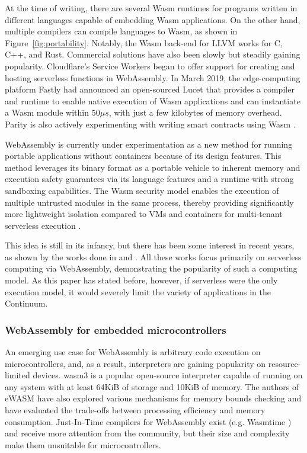 At the time of writing, there are several Wasm runtimes for programs written in different languages capable of embedding Wasm applications. On the other hand, multiple compilers can compile languages to Wasm, as shown in Figure~\ref{fig:portability}. Notably, the Wasm back-end for LLVM \cite{llvm} works for C, C++, and Rust. Commercial solutions have also been slowly but steadily gaining popularity. Cloudflare's Service Workers \cite{cloudflare-workers} began to offer support for creating and hosting serverless functions in WebAssembly. In March 2019, the edge-computing platform Fastly had announced an open-sourced Lucet \cite{fastly-lucet} that provides a compiler and runtime to enable native execution of Wasm applications and can instantiate a Wasm module within $50\mu s$, with just a few kilobytes of memory overhead. Parity is also actively experimenting with writing smart contracts using Wasm \cite{parity-wasm}.

WebAssembly is currently under experimentation as a new method for running portable applications without containers because of its design features. This method leverages its binary format as a portable vehicle to inherent memory and execution safety guarantees via its language features and a runtime with strong sandboxing capabilities. The Wasm security model enables the execution of multiple untrusted modules in the same process, thereby providing significantly more lightweight isolation compared to VMs and containers for multi-tenant serverless execution \cite{gadepalli2020sledge}.

This idea is still in its infancy, but there has been some interest in recent years, as shown by the works done in \cite{hall2019execution} and \cite{shillaker2020faasm}. All these works focus primarily on serverless computing via WebAssembly, demonstrating the popularity of such a computing model. As this paper has stated before, however, if serverless were the only execution model, it would severely limit the variety of applications in the Continuum.

\subsubsection{WebAssembly for embedded microcontrollers}

An emerging use case for WebAssembly is arbitrary code execution on microcontrollers, and, as a result, interpreters are gaining popularity on resource-limited devices. wasm3 \cite{wasm3} is a popular open-source interpreter capable of running on any system with at least 64KiB of storage and 10KiB of memory. The authors of eWASM \cite{peach2020ewasm} have also explored various mechanisms for memory bounds checking and have evaluated the trade-offs between processing efficiency and memory consumption. Just-In-Time compilers for WebAssembly exist (e.g. Wasmtime \cite{wasmtime}) and receive more attention from the community, but their size and complexity make them unsuitable for microcontrollers.

